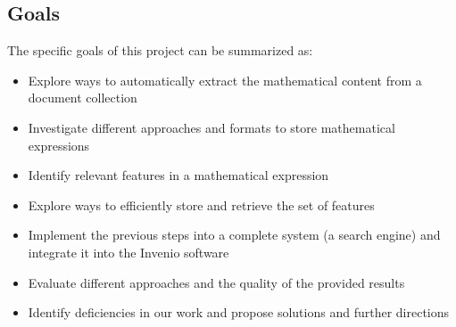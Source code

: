 \subsection{Goals}

The specific goals of this project can be summarized as:

\begin{itemize}
\item Explore ways to automatically extract the mathematical content from a document collection
\item Investigate different approaches and formats to store mathematical expressions
\item Identify relevant features in a mathematical expression 
\item Explore ways to efficiently store and retrieve the set of features
\item Implement the previous steps into a complete system (a search engine) and integrate it into the Invenio software
\item Evaluate different approaches and the quality of the provided results
\item Identify deficiencies in our work and propose solutions and further directions
\end{itemize}